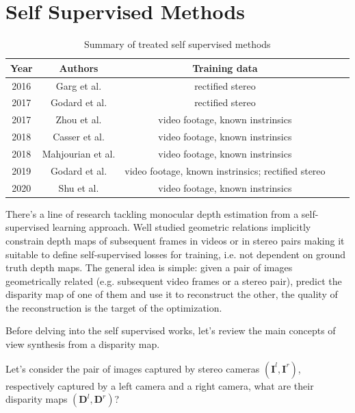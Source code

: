 \newpage
\section{Self Supervised Methods}
\label{s:ssl}


\begin{center}
	\begin{table}[h!]
	\begin{tabular}{| c | c | c | c | c |}
	\hline
	\textbf{Year} & \textbf{Authors} & \textbf{Training data} \\
	\hline
	2016 & Garg et al. \cite{Garg} & rectified stereo\\
	2017 & Godard et al. \cite{MonoDepth} & rectified stereo\\
	2017 & Zhou et al. \cite{SfMLearner} & video footage, known instrinsics\\
	2018 & Casser et al. \cite{struct2depth} & video footage, known instrinsics\\
	2018 & Mahjourian et al. \cite{vid2depth} & video footage, known instrinsics\\
	2019 & Godard et al. \cite{MonoDepth2} & video footage, known instrinsics; rectified stereo\\
	2020 & Shu et al. \cite{FeatDepth} & video footage, known instrinsics\\
	\hline
	\end{tabular}
	\caption{Summary of treated self supervised methods}
	\label{table:3}
	\end{table}
\end{center}

There's a line of research tackling monocular depth estimation from a self-supervised learning approach.
Well studied geometric relations implicitly constrain depth maps of subsequent frames in videos or in stereo pairs making it suitable to define self-supervised losses for training, i.e. not dependent on ground truth depth maps.
The general idea is simple: given a pair of images geometrically related (e.g. subsequent video frames or a stereo pair), predict the disparity map of one of them and use it to reconstruct the other, the quality of the reconstruction is the target of the optimization.

Before delving into the self supervised works, let's review the main concepts of view synthesis from a disparity map.

Let's consider the pair of images captured by stereo cameras $(\mathbf{I}^{l}, \mathbf{I}^{r})$, respectively captured by a left camera and a right camera, what are their disparity maps $(\mathbf{D}^{l}, \mathbf{D}^{r})$?

